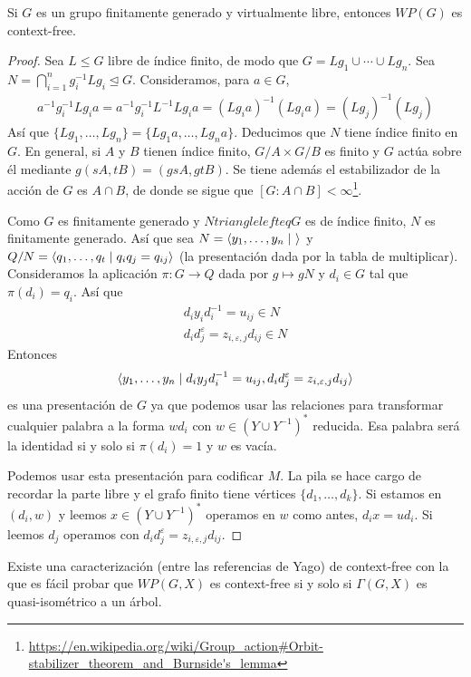 \documentclass[twoside, 11pt]{article}
\begin{document}
\begin{lemma}
Si $G$ es un grupo finitamente generado y virtualmente libre, entonces $WP(G)$ es context-free. 
\end{lemma}
\begin{proof}
Sea $L\leq G$ libre de índice finito, de modo que $G=Lg_1\cup\cdots\cup Lg_n$. Sea $N=\bigcap_{i=1}^n g_i^{-1}Lg_i\trianglelefteq G$. Consideramos, para $a\in G$,
\begin{gather*}
a^{-1}g_i^{-1}Lg_ia=a^{-1}g_i^{-1}L^{-1}Lg_ia=(Lg_ia)^{-1}(Lg_ia)=(Lg_j)^{-1}(Lg_j)
\end{gather*}
Así que $\{Lg_1,\dots, Lg_n\}=\{Lg_1a,\dots, Lg_na\}$. Deducimos que $N$ tiene índice finito en $G$. En general, si $A$ y $B$ tienen índice finito, $G/A\times G/B$ es finito y $G$ actúa sobre él mediante $g(sA,tB)=(gsA,gtB)$. Se tiene además el estabilizador de la acción de $G$ es $A\cap B$, de donde se sigue que $[G:A\cap B]<\infty$\footnote{\url{https://en.wikipedia.org/wiki/Group_action\#Orbit-stabilizer_theorem_and_Burnside's_lemma}}.

Como $G$ es finitamente generado y $Ntrianglelefteq G$ es de índice finito, $N$ es finitamente generado. Así que sea $N=\langle{y_1,\dots, y_n\mid\ }\rangle$ y $Q/N=\langle{q_1,\dots, q_t\mid q_iq_j=q_{ij}}\rangle$ (la presentación dada por la tabla de multiplicar). Consideramos la aplicación $\pi: G\to Q$ dada por $g\mapsto gN$ y $d_i\in G$ tal que $\pi(d_i)=q_i$. Así que 
\begin{gather*}
d_iy_id_i^{-1}=u_{ij}\in N\\
d_id_j^{\varepsilon}=z_{i,\varepsilon,j}d_{ij}\in N
\end{gather*}
Entonces 
\[
\langle{y_1,\dots, y_n\mid d_iy_jd_i^{-1}=u_{ij}, d_id_j^{\varepsilon}=z_{i,\varepsilon,j}d_{ij}}\rangle
\]
es una presentación de $G$ ya que podemos usar las relaciones para transformar cualquier palabra a la forma $wd_i$ con $w\in (Y\cup Y^{-1})^*$ reducida. Esa palabra será la identidad si y solo si $\pi(d_i)=1$ y $w$ es vacía. 

Podemos usar esta presentación para codificar $M$. La pila se hace cargo de recordar la parte libre y el grafo finito tiene vértices $\{d_1,\dots, d_k\}$. Si estamos en $(d_i,w)$ y leemos $x\in (Y\cup Y^{-1})^*$ operamos en $w$ como antes, $d_ix=ud_i$. Si leemos $d_j$ operamos con $d_id_j^{\varepsilon}=z_{i,\varepsilon,j}d_{ij}$.
\end{proof}

Existe una caracterización (entre las referencias de Yago) de context-free con la que es fácil probar que $WP(G,X)$ es context-free si y solo si $\Gamma(G,X)$ es quasi-isométrico a un árbol. 
\end{document}
